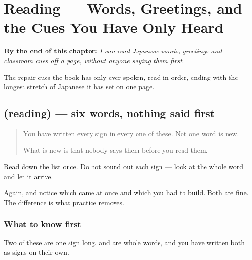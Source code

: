 
\chapter{Reading — Words, Greetings, and the Cues You Have Only Heard}
\label{ch:ja-yomu}

\begin{chapteropening}
\textbf{By the end of this chapter:} \emph{I can read Japanese words, greetings and classroom cues off a page, without anyone saying them first.}

The repair cues the book has only ever spoken, read in order, ending with the longest stretch of Japanese it has set on one page.
\end{chapteropening}

\section[(reading)]{(reading) — six words, nothing said first}

\label{lesson:JA-C19-words}



\begin{quote}
You have written every sign in every one of these. Not one word is new.

What is new is that nobody says them before you read them.
\end{quote}

\begin{tcolorbox}[breakable,skin=enhanced,colback=orange!6,colframe=orange!45!black,boxrule=0.5pt,arc=1mm,left=6pt,right=6pt,top=4pt,bottom=4pt,fonttitle=\bfseries,title={Read this}]
\begin{quote}
     
\end{quote}

Read down the list once. Do not sound out each sign — look at the whole word and let it arrive.

Again, and notice which came at once and which you had to build. Both are fine. The difference is what practice removes.
\end{tcolorbox}

\subsection*{What to know first}
Two of these are one sign long. \textbf{} and \textbf{} are whole words, and you have written both as signs on their own.

